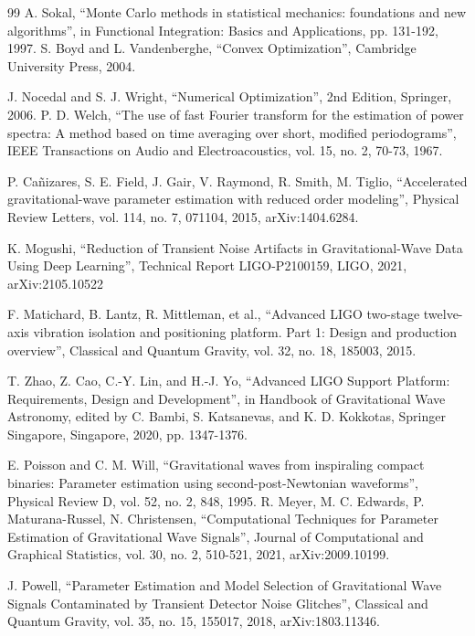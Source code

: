 \documentclass[12pt]{article}
\begin{document}
\begin{thebibliography}{99}
  A. Sokal,
  ``Monte Carlo methods in statistical mechanics: foundations and new algorithms'',
  in Functional Integration: Basics and Applications, pp. 131-192, 1997.
  S. Boyd and L. Vandenberghe,
  ``Convex Optimization'',
  Cambridge University Press, 2004.

  J. Nocedal and S. J. Wright,
  ``Numerical Optimization'', 2nd Edition,
  Springer, 2006.
  P. D. Welch,
  ``The use of fast Fourier transform for the estimation of power spectra: A method based on time averaging over short, modified periodograms'',
  IEEE Transactions on Audio and Electroacoustics, vol. 15, no. 2, 70-73, 1967.

  P. Cañizares, S. E. Field, J. Gair, V. Raymond, R. Smith, M. Tiglio,
  ``Accelerated gravitational-wave parameter estimation with reduced order modeling'',
  Physical Review Letters, vol. 114, no. 7, 071104, 2015,
  arXiv:1404.6284.

  K. Mogushi,
  ``Reduction of Transient Noise Artifacts in Gravitational-Wave Data Using Deep Learning'',
  Technical Report LIGO-P2100159, LIGO, 2021,
  arXiv:2105.10522

  F. Matichard, B. Lantz, R. Mittleman, et al.,
  ``Advanced LIGO two-stage twelve-axis vibration isolation and positioning platform. Part 1: Design and production overview'',
  Classical and Quantum Gravity, vol. 32, no. 18, 185003, 2015.

  T. Zhao, Z. Cao, C.-Y. Lin, and H.-J. Yo,
  ``Advanced LIGO Support Platform: Requirements, Design and Development'',
  in Handbook of Gravitational Wave Astronomy,
  edited by C. Bambi, S. Katsanevas, and K. D. Kokkotas, Springer Singapore, Singapore, 2020, pp. 1347-1376.


  E. Poisson and C. M. Will,
  ``Gravitational waves from inspiraling compact binaries: Parameter estimation using second-post-Newtonian waveforms'',
  Physical Review D, vol. 52, no. 2, 848, 1995.
  R. Meyer, M. C. Edwards, P. Maturana-Russel, N. Christensen,
  ``Computational Techniques for Parameter Estimation of Gravitational Wave Signals'',
  Journal of Computational and Graphical Statistics, vol. 30, no. 2, 510-521, 2021,
  arXiv:2009.10199.

  J. Powell,
  ``Parameter Estimation and Model Selection of Gravitational Wave Signals Contaminated by Transient Detector Noise Glitches'',
  Classical and Quantum Gravity, vol. 35, no. 15, 155017, 2018,
  arXiv:1803.11346.


\end{thebibliography}
\end{document}
